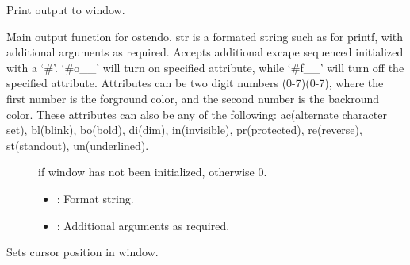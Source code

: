 \documentclass[letterpaper,10pt,english]{sphinxmanual}
\begin{document}
\begin{fulllineitems}
\begin{fulllineitems}
\end{fulllineitems}


\begin{fulllineitems}
\label{\detokenize{index:_CPPv2N7ostendo6Window5PrintENSt6stringEz}}%
\pysigstartmultiline
{}\label{\detokenize{index:Pessumclassostendo_1_1Window_1a1781807aea1eb5dedc9f2885e41fcd2b}}%
\pysigstopmultiline
Print output to window. 

Main output function for ostendo. str is a formated string such as for printf, with additional arguments as required. Accepts additional excape sequenced initialized with a `\#'. `\#o\_\_' will turn on specified attribute, while `\#f\_\_' will turn off the specified attribute. Attributes can be two digit numbers (0-7)(0-7), where the first number is the forground color, and the second number is the backround color. These attributes can also be any of the following: ac(alternate character set), bl(blink), bo(bold), di(dim), in(invisible), pr(protected), re(reverse), st(standout), un(underlined). \begin{description}
\item[{}]  if window has not been initialized, otherwise 0. 

\item[{}] \leavevmode\begin{itemize}
\item {} 
: Format string. 

\item {} 
: Additional arguments as required. 

\end{itemize}

\end{description}


\end{fulllineitems}


\begin{fulllineitems}
\label{\detokenize{index:_CPPv2N7ostendo6Window7SetCursEii}}%
\pysigstartmultiline
{}\label{\detokenize{index:Pessumclassostendo_1_1Window_1a4e6839482997c00795f3c4191d80b3c4}}%
\pysigstopmultiline
Sets cursor position in window. 


\end{fulllineitems}
\end{fulllineitems}
\end{document}
